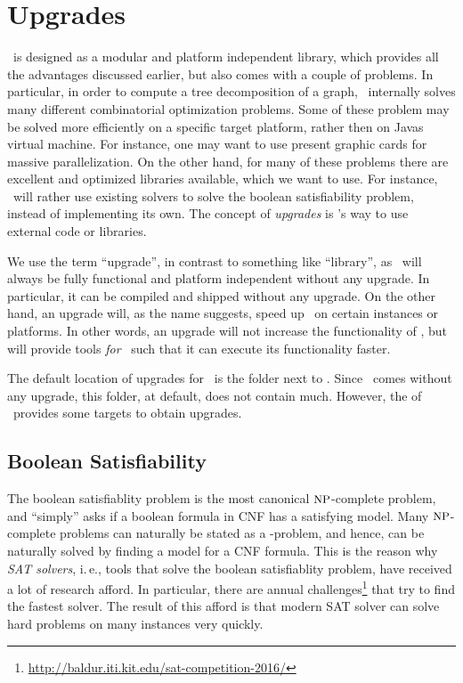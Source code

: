 \documentclass[a4paper, ukenglish, twoside, openright]{jdrasilmanual}
\author{Max Bannach, Sebastian Berndt, Thorsten Ehlers}
\begin{document}
\part{Upgrades}

\Jdrasil\ is designed as a modular and platform independent library,
which provides all the advantages discussed earlier, but also comes
with a couple of problems. In particular, in order to compute a tree
decomposition of a graph, \Jdrasil\ internally solves many different
combinatorial optimization problems. Some of these problem may be
solved more efficiently on a specific target platform, rather then on
Javas virtual machine. For instance, one may want to use present
graphic cards for massive parallelization. On the other hand, for many
of these problems there are excellent and optimized libraries
available, which we want to use. For instance, \Jdrasil\ will rather
use existing  solvers to solve the boolean satisfiability
problem, instead of implementing its own. The concept of
\emph{upgrades} is \Jdrasil's way to use external code or
libraries. 

We use the term ``upgrade'', in contrast to something like
``library'', as \Jdrasil\ will always be fully functional and platform
independent without any upgrade. In particular, it can be compiled and
shipped without any upgrade. On the other hand, an upgrade will, as
the name suggests, speed up \Jdrasil\ on certain instances or
platforms. In other words, an upgrade will not increase the
functionality of \Jdrasil, but will provide tools \emph{for} \Jdrasil\
such that it can execute its functionality faster.

The default location of upgrades for \Jdrasil\ is the folder
 next to . Since \Jdrasil\ comes
without any upgrade, this folder, at default, does not contain
much. However, the  of \Jdrasil\ provides some targets
to obtain upgrades.

\chapter{Boolean Satisfiability}
The boolean satisfiablity problem  is the most canonical
$\Class{NP}$-complete problem, and ``simply'' asks if a boolean
formula in CNF has a satisfying model. Many $\Class{NP}$-complete
problems can naturally be stated as a \Lang{SAT}-problem, and hence, can
be naturally solved by finding a model for a CNF formula. This is the
reason why \emph{SAT solvers}, i.\,e., tools that solve the boolean
satisfiablity problem, have received a lot of research afford. In
particular, there are annual challenges\footnote{\url{http://baldur.iti.kit.edu/sat-competition-2016/}} that try to
find the fastest solver. The result of this afford is that modern
SAT solver can solve hard problems on many instances very quickly.
\end{document}
